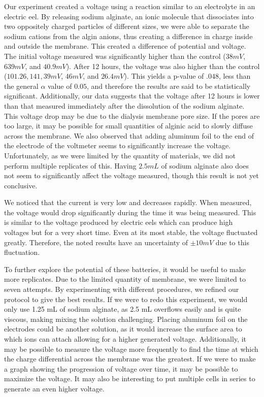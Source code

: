 \documentclass[letterpaper]{article}
\begin{document}
Our experiment created a voltage using a reaction similar to an electrolyte in an electric 
eel. By releasing sodium alginate, an ionic molecule that dissociates into two oppositely 
charged particles of different sizes, we were able to separate the sodium cations from the 
algin anions, thus creating a difference in charge inside and outside the membrane. This 
created a difference of potential and voltage. The initial voltage measured was significantly 
higher than the control ($38mV$, $639mV$, and $40.9mV$). After 12 hours, the voltage was also higher 
than the control ($101.26,141,39mV$, $46mV$, and $26.4 mV$). This yields a p-value of $.048$, less than 
the general $\alpha$ value of $0.05$, and therefore the results are said to be statistically significant. 
Additionally, our data suggests that the voltage after 12 hours is lower than that measured 
immediately after the dissolution of the sodium alginate. This voltage drop may be due to the 
dialysis membrane pore size. If the pores are too large, it may be possible for small quantities of 
alginic acid to slowly diffuse across the membrane. We also observed that adding aluminum foil to 
the end of the electrode of the voltmeter seems to significantly increase the voltage. Unfortunately, 
as we were limited by the quantity of materials, we did not perform multiple replicates of this. 
Having $2.5mL$ of sodium alginate also does not seem to significantly affect the voltage measured, though 
this result is not yet conclusive.

We noticed that the current is very low and decreases rapidly. When measured, the voltage would drop 
significantly during the time it was being measured. This is similar to the voltage produced by electric 
eels which can produce high voltages but for a very short time. Even at its most stable, the voltage 
fluctuated greatly. Therefore, the noted results have an uncertainty of $\pm 10mV$ due to this fluctuation.

To further explore the potential of these batteries, it would be useful to make more replicates. Due 
to the limited quantity of membrane, we were limited to seven attempts. By experimenting with different 
procedures, we refined our protocol to give the best results. If we were to redo this experiment, we 
would only use 1.25 mL of sodium alginate, as 2.5 mL overflows easily and is quite viscous, making mixing 
the solution challenging. Placing aluminum foil on the electrodes could be another solution, as it would 
increase the surface area to which ions can attach allowing for a higher generated voltage. Additionally, 
it may be possible to measure the voltage more frequently to find the time at which the charge differential 
across the membrane was the greatest. If we were to make a graph showing the progression of voltage over 
time, it may be possible to maximize the voltage. It may also be interesting to put multiple cells in series 
to generate an even higher voltage.


\printbibliography[heading=bibintoc]
\end{document}
